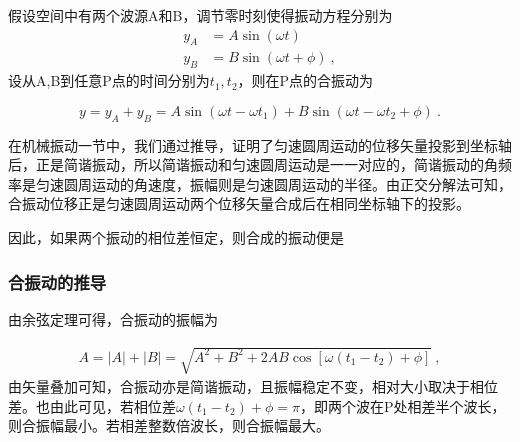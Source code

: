 假设空间中有两个波源A和B，调节零时刻使得振动方程分别为
\begin{equation}
\begin{aligned}
y_A&=A\sin(\omega t)\\
y_B&=B\sin (\omega t+\phi)~,
\end{aligned}
\end{equation}
设从A,B到任意P点的时间分别为$t_1,t_2$，则在P点的合振动为

\begin{equation}
y=y_A+y_B=A\sin(\omega t-\omega t_1)+B\sin(\omega t-\omega t_2+\phi)~.
\end{equation}

在机械振动一节中，我们通过推导，证明了匀速圆周运动的位移矢量投影到坐标轴后，正是简谐振动，所以简谐振动和匀速圆周运动是一一对应的，简谐振动的角频率是匀速圆周运动的角速度，振幅则是匀速圆周运动的半径。由正交分解法可知，合振动位移正是匀速圆周运动两个位移矢量合成后在相同坐标轴下的投影。

因此，如果两个振动的相位差恒定，则合成的振动便是
\subsubsection{合振动的推导}
由余弦定理可得，合振动的振幅为

\begin{equation}
\begin{aligned}
A=|A|+|B|=\sqrt{A^2+B^2+2AB\cos[\omega(t_1-t_2)+\phi]}~,
\end{aligned}
\end{equation}
由矢量叠加可知，合振动亦是简谐振动，且振幅稳定不变，相对大小取决于相位差。也由此可见，若相位差$\omega(t_1-t_2)+\phi=\pi$，即两个波在P处相差半个波长，则合振幅最小。若相差整数倍波长，则合振幅最大。